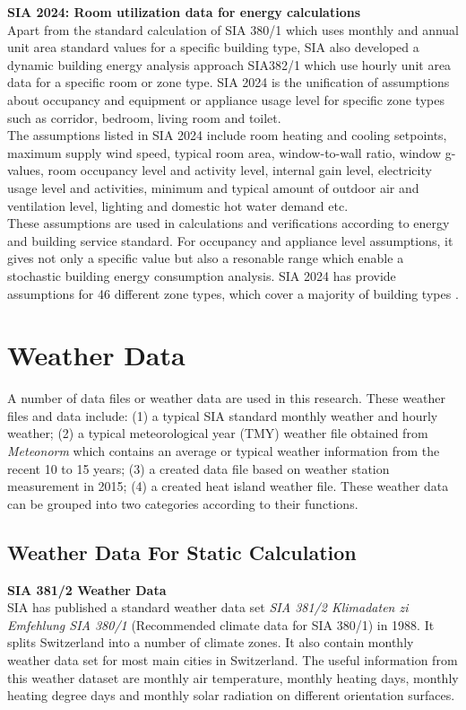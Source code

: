 \documentclass[a4paper, oneside]{discothesis}
\begin{document}
		\textbf{SIA 2024: Room utilization data for energy calculations}\\
		Apart from the standard calculation of SIA 380/1 which uses monthly and annual unit area standard values for a specific building type, SIA also developed a dynamic building energy analysis approach SIA382/1 which use hourly unit area data for a specific room or zone type. SIA 2024 is the unification of assumptions about occupancy and equipment or appliance usage level for specific zone types such as corridor, bedroom, living room and toilet.\\

		The assumptions listed in SIA 2024 include room heating and cooling setpoints, maximum supply wind speed, typical room area, window-to-wall ratio, window g-values, room occupancy level and activity level, internal gain level, electricity usage level and activities, minimum and typical amount of outdoor air and ventilation level, lighting and domestic hot water demand etc.\\

		These assumptions are used in calculations and verifications according to energy and building service standard. For occupancy and appliance level assumptions, it gives not only a specific value but also a resonable range which enable a stochastic building energy consumption analysis. SIA 2024 has provide assumptions for 46 different zone types, which cover a majority of building types \cite{SIA2024Shop}.

		\section{Weather Data}
		A number of data files or weather data are used in this research. These weather files and data include: (1) a typical SIA standard monthly weather and hourly weather; (2) a typical meteorological year (TMY) weather file obtained from \textit{Meteonorm} which contains an average or typical weather information from the recent 10 to 15 years; (3) a created data file based on weather station measurement in 2015; (4) a created heat island weather file. These weather data can be grouped into two categories according to their functions.

		\subsection{Weather Data For Static Calculation}
		\textbf{SIA 381/2 Weather Data}\\
		SIA has published a standard weather data set \textit{SIA 381/2 Klimadaten zi Emfehlung SIA 380/1} (Recommended climate data for SIA 380/1) in 1988. It splits Switzerland into a number of climate zones. It also contain monthly weather data set for most main cities in Switzerland. The useful information from this weather dataset are monthly air temperature, monthly heating days, monthly heating degree days and monthly solar radiation on different orientation surfaces.\\
\end{document}
